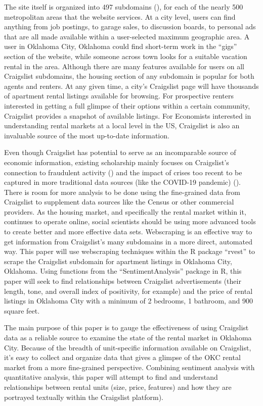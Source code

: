 \documentclass[12pt,english]{article}
\begin{document}
The site itself is organized into 497 subdomains (\citet{thompsongithub}), for each of the nearly 500 metropolitan areas that the website services. At a city level, users can find anything from job postings, to garage sales, to discussion boards, to personal ads that are all made available within a user-selected maximum geographic area. A user in Oklahoma City, Oklahoma could find short-term work in the “gigs” section of the website, while someone across town looks for a suitable vacation rental in the area. Although there are many features available for users on all Craigslist subdomains, the housing section of any subdomain is popular for both agents and renters. At any given time, a city’s Craigslist page will have thousands of apartment rental listings available for browsing. For prospective renters interested in getting a full glimpse of their options within a certain community, Craigslist provides a snapshot of available listings. For Economists interested in understanding rental markets at a local level in the US, Craigslist is also an invaluable source of the most up-to-date information.  

Even though Craigslist has potential to serve as an incomparable source of economic information, existing scholarship mainly focuses on Craigslist’s connection to fraudulent activity (\citet{Garg2013}) and the impact of crises too recent to be captured in more traditional data sources (like the COVID-19 pandemic) (\citet{Kuk2021}). There is room for more analysis to be done using the fine-grained data from Craigslist to supplement data sources like the Census or other commercial providers. As the housing market, and specifically the rental market within it, continues to operate online, social scientists should be using more advanced tools to create better and more effective data sets. Webscraping is an effective way to get information from Craigslist’s many subdomains in a more direct, automated way. This paper will use webscraping techniques within the R package “rvest” to scrape the Craigslist subdomain for apartment listings in Oklahoma City, Oklahoma. Using functions from the “SentimentAnalysis” package in R, this paper will seek to find relationships between Craigslist advertisements (their length, tone, and overall index of positivity, for example) and the price of rental listings in Oklahoma City with a minimum of 2 bedrooms, 1 bathroom, and 900 square feet.  

The main purpose of this paper is to gauge the effectiveness of using Craigslist data as a reliable source to examine the state of the rental market in Oklahoma City. Because of the breadth of unit-specific information available on Craigslist, it’s easy to collect and organize data that gives a glimpse of the OKC rental market from a more fine-grained perspective. Combining sentiment analysis with quantitative analysis, this paper will attempt to find and understand relationships between rental units (size, price, features) and how they are portrayed textually within the Craigslist platform). 
\end{document}
